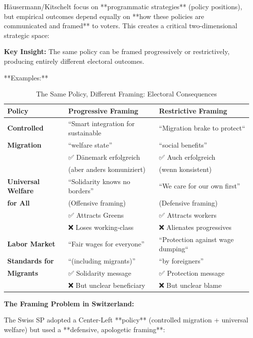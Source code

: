 Häusermann/Kitschelt focus on **programmatic strategies** (policy positions), but empirical outcomes depend equally on **how these policies are communicated and framed** to voters. This creates a critical two-dimensional strategic space:

\textbf{Key Insight:} The same policy can be framed progressively or restrictively, producing entirely different electoral outcomes.

**Examples:**

\begin{table}[h]
\centering
\caption{The Same Policy, Different Framing: Electoral Consequences}
\label{tab:policy-framing-matrix}
\small
\begin{tabular}{lll}
\toprule
\textbf{Policy} & \textbf{Progressive Framing} & \textbf{Restrictive Framing} \\
\midrule
\textbf{Controlled} & ``Smart integration for sustainable & ``Migration brake to protect`` \\
\textbf{Migration} & ``welfare state'' & ``social benefits'' \\
 & ✅ Dänemark erfolgreich & ✅ Auch erfolgreich \\
 & (aber anders komuniziert) & (wenn konsistent) \\
\midrule
\textbf{Universal Welfare} & ``Solidarity knows no borders'' & ``We care for our own first'' \\
\textbf{for All} & (Offensive framing) & (Defensive framing) \\
 & ✅ Attracts Greens & ✅ Attracts workers \\
 & ❌ Loses working-class & ❌ Alienates progressives \\
\midrule
\textbf{Labor Market} & ``Fair wages for everyone'' & ``Protection against wage dumping`` \\
\textbf{Standards for} & ``(including migrants)'' & ``by foreigners'' \\
\textbf{Migrants} & ✅ Solidarity message & ✅ Protection message \\
 & ❌ But unclear beneficiary & ❌ But unclear blame \\
\bottomrule
\end{tabular}
\end{table}

\textbf{The Framing Problem in Switzerland:}

The Swiss SP adopted a Center-Left **policy** (controlled migration + universal welfare) but used a **defensive, apologetic framing**:

